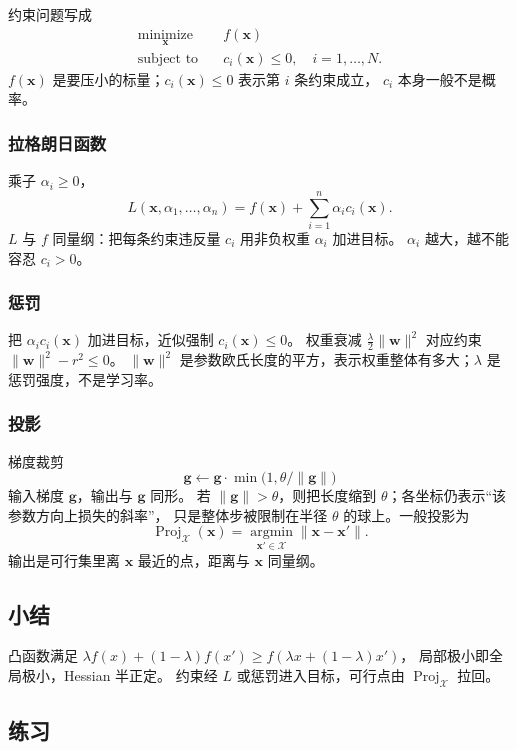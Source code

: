 约束问题写成
\begin{align*}
\operatorname*{minimize}_{\bm{x}}&\quad f(\bm{x})
\\
\text{subject to}&\quad
c_i(\bm{x})\leq 0,\quad i=1,\ldots,N.
\end{align*}
$f(\bm{x})$ 是要压小的标量；$c_i(\bm{x})\leq 0$ 表示第 $i$ 条约束成立，
$c_i$ 本身一般不是概率。

\subsubsection{拉格朗日函数}

乘子 $\alpha_i\geq 0$，
\[
L(\bm{x},\alpha_1,\ldots,\alpha_n)
=
f(\bm{x})+\sum_{i=1}^{n}\alpha_i c_i(\bm{x}).
\]
$L$ 与 $f$ 同量纲：把每条约束违反量 $c_i$ 用非负权重 $\alpha_i$ 加进目标。
$\alpha_i$ 越大，越不能容忍 $c_i>0$。

\subsubsection{惩罚}

把 $\alpha_i c_i(\bm{x})$ 加进目标，近似强制 $c_i(\bm{x})\leq 0$。
权重衰减 $\frac{\lambda}{2}\|\bm{w}\|^2$ 对应约束 $\|\bm{w}\|^2-r^2\leq 0$。
$\|\bm{w}\|^2$ 是参数欧氏长度的平方，表示权重整体有多大；$\lambda$ 是惩罚强度，不是学习率。

\subsubsection{投影}

梯度裁剪
\[
\bm{g}\leftarrow \bm{g}\cdot\min\bigl(1,\theta/\|\bm{g}\|\bigr)
\]
输入梯度 $\bm{g}$，输出与 $\bm{g}$ 同形。
若 $\|\bm{g}\|>\theta$，则把长度缩到 $\theta$；各坐标仍表示“该参数方向上损失的斜率”，
只是整体步被限制在半径 $\theta$ 的球上。一般投影为
\[
\operatorname{Proj}_{\mathcal{X}}(\bm{x})
=
\operatorname*{argmin}_{\bm{x}'\in\mathcal{X}}\|\bm{x}-\bm{x}'\|.
\]
输出是可行集里离 $\bm{x}$ 最近的点，距离与 $\bm{x}$ 同量纲。

\subsection{小结}

凸函数满足
$\lambda f(x)+(1-\lambda)f(x')\geq f(\lambda x+(1-\lambda)x')$，
局部极小即全局极小，Hessian 半正定。
约束经 $L$ 或惩罚进入目标，可行点由 $\operatorname{Proj}_{\mathcal{X}}$ 拉回。

\subsection{练习}

